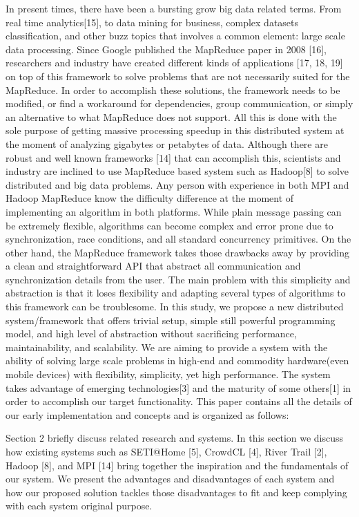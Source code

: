 \documentclass[10pt,reprint]{socc14}
\begin{document}
In present times, there have been a bursting grow big data related terms.  From real time analytics[15], to data mining for business, complex datasets classification, and other buzz topics that involves a common element: large scale data processing. Since Google published the MapReduce paper in 2008 [16], researchers and industry have created different kinds of applications [17, 18, 19] on top of this framework to solve problems that are not necessarily suited for the MapReduce. In order to accomplish these solutions, the framework needs to be modified, or find a workaround for dependencies, group communication, or simply an alternative to what MapReduce does not support. All this is done with the sole purpose of getting massive processing speedup in this distributed system at the moment of analyzing gigabytes or petabytes of data. Although there are robust and well known frameworks [14] that can accomplish this, scientists and industry are inclined to use MapReduce based system such as Hadoop[8] to solve distributed and big data problems. Any person with experience in both MPI and Hadoop MapReduce know the difficulty difference at the moment of implementing an algorithm in both platforms. While plain message passing can be extremely flexible, algorithms can become complex and error prone due to synchronization, race conditions, and all standard concurrency primitives. On the other hand, the MapReduce framework takes those drawbacks away by providing a clean and straightforward API that abstract all communication and synchronization details from the user. The main problem with this simplicity and abstraction is that it loses flexibility and adapting several types of algorithms to this framework can be troublesome. In this study, we propose a new distributed system/framework that offers trivial setup, simple still powerful programming model, and high level of abstraction without sacrificing performance, maintainability, and scalability. We are aiming to provide a system with the ability of solving large scale problems in high-end and commodity hardware(even mobile devices) with flexibility, simplicity, yet high  performance. The system takes advantage of emerging technologies[3] and the maturity of some others[1] in order to accomplish our target functionality. This paper contains all the details of our early implementation and concepts and is organized as follows: 

Section 2 briefly discuss related research and systems. In this section we discuss how existing systems such as SETI@Home [5], CrowdCL [4], River Trail [2], Hadoop [8], and MPI [14] bring together the inspiration and the fundamentals of our system. We present the advantages and disadvantages of each system and how our proposed solution tackles those disadvantages to fit and keep complying with each system original purpose.
\end{document}
